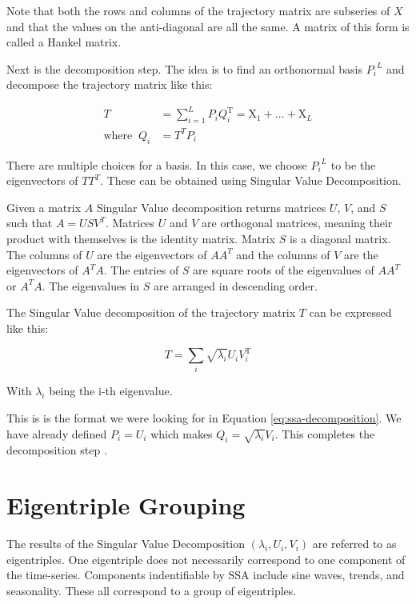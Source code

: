 Note that both the rows and columns of the trajectory matrix are subseries of $X$ and that the values on the anti-diagonal are all the same. A matrix of this form is called a Hankel matrix. 

Next is the decomposition step. The idea is to find an orthonormal basis ${P_i}^L$ and decompose the trajectory matrix like this: 

\begin{equation}
   \begin{aligned}
   T&=\sum_{i=1}^{L} P_{i} Q_{i}^{\mathrm{T}}=\mathrm{X}_{1}+\ldots+\mathrm{X}_{L} \\
   \text{where} \;\; Q_i &= T^TP_i
   \end{aligned}
   \label{eq:ssa-decomposition}
\end{equation}

There are multiple choices for a basis. In this case, we choose ${P_i}^L$ to be the eigenvectors of $TT^T$. These can be obtained using Singular Value Decomposition. 

Given a matrix $A$ Singular Value decomposition returns matrices $U$, $V$, and $S$ such that $A = USV^T$. Matrices $U$ and $V$ are orthogonal matrices, meaning their product with themselves is the identity matrix. Matrix $S$ is a diagonal matrix. The columns of $U$ are the eigenvectors of $AA^T$ and the columns of $V$ are the eigenvectors of $A^TA$. The entries of $S$ are square roots of the eigenvalues of $AA^T$ or $A^TA$. The eigenvalues in $S$ are arranged in descending order. 

The Singular Value decomposition of the trajectory matrix $T$ can be expressed like this: 

\begin{equation}
T=\sum_{i} \sqrt{\lambda_{i}} U_{i} V_{i}^{\mathrm{T}}
\end{equation}

With $\lambda_i$ being the i-th eigenvalue.

This is is the format we were looking for in Equation \eqref{eq:ssa-decomposition}. We have already defined $P_i=U_i$ which makes $Q_i = \sqrt{\lambda_i}V_i$. This completes the decomposition step \parencite{golyandina2014basic}.

\section{Eigentriple Grouping}

The results of the Singular Value Decomposition $(\lambda_i, U_i, V_i)$ are referred to as eigentriples. One eigentriple does not necessarily correspond to one component of the time-series. Components indentifiable by SSA include sine waves, trends, and seasonality. These all correspond to a group of eigentriples. 


